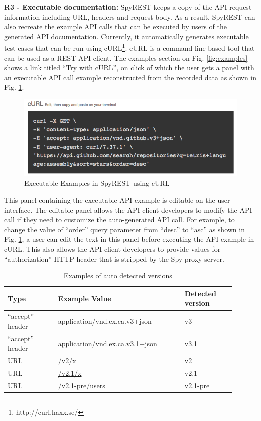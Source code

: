 \documentclass[conference]{IEEEtran}
\begin{document}
\textbf{R3 -  Executable documentation:} SpyREST keeps a copy of the API request information including URL, headers and request body. As a result, SpyREST can also recreate the example API calls that can be executed by users of the generated API documentation. Currently, it automatically generates executable test cases that can be run using cURL\footnote{http://curl.haxx.se/}. cURL is a command line based tool that can be used as a REST API client. The examples section on Fig. \ref{fig:examples} shows a link titled ``Try with cURL'', on click of which the user gets a panel with an executable API call example reconstructed from the recorded data as shown in Fig. \ref{fig:curl}.

\begin{figure}[!tbh]
  \centering
  \includegraphics[width=\linewidth]{curl.png}
  \caption{Executable Examples in SpyREST using cURL}
  \label{fig:curl}
\end{figure}

This panel containing the executable API example is editable on the user interface. The editable panel allows the API client developers to modify the API call if they need to customize the auto-generated API call. For example, to change the value of ``order'' query parameter from ``desc'' to ``asc''  as shown in Fig. \ref{fig:curl}, a user can edit the text in this panel before executing the API example in cURL. This also allows the API client developers to provide values for ``authorization'' HTTP header that is stripped by the Spy proxy server.

\begin{table}[!tbh]
  \caption{Examples of auto detected versions}
  \begin{tabular}{|p{0.2\linewidth}|p{0.5\linewidth}|p{0.2\linewidth}|}
    \hline
    Type & Example Value & Detected version\\
    \hline
    ``accept'' header & application/vnd.ex.ca.v3+json & v3\\
    \hline
    ``accept'' header & application/vnd.ex.ca.v3.1+json & v3.1\\
    \hline
    URL & \url{/v2/x} & v2\\
    \hline
    URL & \url{/v2.1/x} & v2.1\\
    \hline
    URL & \url{/v2.1-pre/users} & v2.1-pre\\
    \hline
  \end{tabular}
  \label{table:versions}
\end{table}
\end{document}
